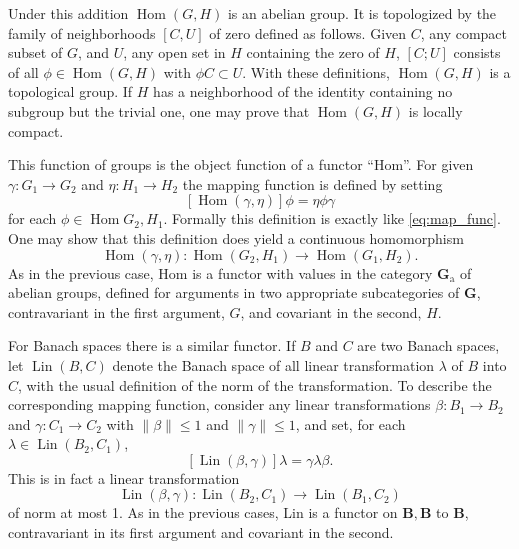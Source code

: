 \documentclass[11pt,a4paper]{report}
\DeclareMathOperator{\hm}{Hom}
\DeclareMathOperator{\lin}{Lin}
\begin{document}
Under this addition $\hm(G,H)$ is an abelian group. It is topologized by the family of neighborhoods $[C,U]$ of zero
defined as follows. Given $C$, any compact subset of $G$, and $U$, any open set in $H$ containing the zero of $H$,
$[C;U]$ consists of all $\phi\in\hm(G,H)$ with $\phi C\subset U$. With these definitions, $\hm(G,H)$ is a topological
group. If $H$ has a neighborhood of the identity containing no subgroup but the trivial one, one may prove that
$\hm(G,H)$ is locally compact.

This function of groups is the object function of a functor ``Hom''. For given $\gamma:G_1\rightarrow G_2$ and
$\eta: H_1\rightarrow H_2$ the mapping function is defined by setting
\begin{equation}\label{eq:func_grp}
	[\hm(\gamma,\eta)]\phi =  \eta\phi\gamma
\end{equation}
for each $\phi\in\hm{G_2,H_1}$. Formally this definition is exactly like \cref{eq:map_func}. One may show that
this definition  does yield a continuous homomorphism
\begin{equation*}
	\hm(\gamma,\eta):\hm(G_2,H_1)\rightarrow\hm(G_1,H_2).
\end{equation*}
As in the previous case, Hom is a functor with values in the category $\mathbf{G}_\mathrm{a}$ of abelian groups,
defined for arguments in two appropriate subcategories of $\mathbf{G}$, contravariant in the first argument, $G$,
and covariant in the second, $H$.

For Banach spaces there is a similar functor. If $B$ and $C$ are two Banach spaces, let $\lin(B,C)$ denote the Banach
space of all linear transformation $\lambda$ of $B$ into $C$, with the usual definition of the norm of the transformation.
To describe the corresponding mapping function, consider any linear transformations $\beta:B_1\rightarrow B_2$ and
$\gamma:C_1\rightarrow C_2$ with $\|\beta\|\le 1$ and $\|\gamma\|\le 1$, and set, for each $\lambda\in\lin(B_2,C_1)$,
\begin{equation}\label{eq:func_banach}
	[\lin(\beta,\gamma)]\lambda= \gamma\lambda\beta.
\end{equation}
This is in fact a linear transformation
\begin{equation*}
	\lin(\beta,\gamma):\lin(B_2,C_1)\rightarrow\lin(B_1,C_2)
\end{equation*}
of norm at most 1. As in the previous cases, Lin is a functor on $\mathbf{B},\mathbf{B}$ to $\mathbf{B}$, contravariant
in its first argument and covariant in the second.
\end{document}
